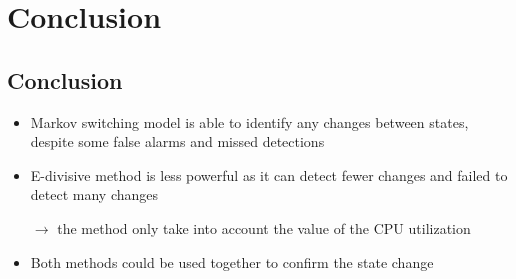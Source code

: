 \documentclass{beamer}
\begin{document}
\begin{frame}[fragile]

\end{frame}


\section{Conclusion}
\subsection{Conclusion}
\begin{frame}
\begin{itemize}
	\item Markov switching model is able to identify any changes between states, despite some false alarms and missed detections
	\item E-divisive method  is less powerful as it can detect fewer changes and failed to detect many changes
	
	$\rightarrow$ the method only take into account the value of the CPU utilization
	
	\item Both methods could be used together to confirm the state change
\end{itemize}
\end{frame}

\end{document}
